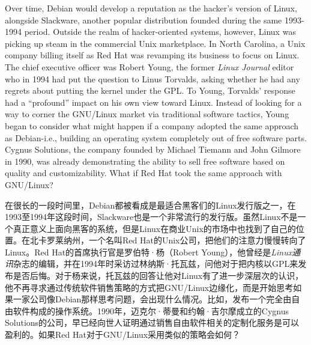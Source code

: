 \ifdefined\eng
Over time, Debian would develop a reputation as the hacker's version of Linux, alongside Slackware, another popular distribution founded during the same 1993-1994 period. Outside the realm of hacker-oriented systems, however, Linux was picking up steam in the commercial Unix marketplace. In North Carolina, a Unix company billing itself as Red Hat was revamping its business to focus on Linux. The chief executive officer was Robert Young, the former \textit{Linux Journal} editor who in 1994 had put the question to Linus Torvalds, asking whether he had any regrets about putting the kernel under the GPL. To Young, Torvalds' response had a ``profound'' impact on his own view toward Linux. Instead of looking for a way to corner the GNU/Linux market via traditional software tactics, Young began to consider what might happen if a company adopted the same approach as Debian-i.e., building an operating system completely out of free software parts. Cygnus Solutions, the company founded by Michael Tiemann and John Gilmore in 1990, was already demonstrating the ability to sell free software based on quality and customizability. What if Red Hat took the same approach with GNU/Linux?

\fi

\ifdefined\chs
在很长的一段时间里，Debian都被看成是最适合黑客们的Linux发行版之一，在1993至1994年这段时间，Slackware也是一个非常流行的发行版。虽然Linux不是一个真正意义上面向黑客的系统，但是Linux在商业Unix的市场中也找到了自己的位置。在北卡罗莱纳州，一个名叫Red Hat的Unix公司，把他们的注意力慢慢转向了Linux。Red Hat的首席执行官是罗伯特·杨（Robert Young），他曾经是\textit{Linux通讯}杂志的编辑，并在1994年时采访过林纳斯·托瓦兹，问他对于把内核以GPL来发布是否后悔。对于杨来说，托瓦兹的回答让他对Linux有了进一步深层次的认识，他不再寻求通过传统软件销售策略的方式把GNU/Linux边缘化，而是开始思考如果一家公司像Debian那样思考问题，会出现什么情况。比如，发布一个完全由自由软件构成的操作系统。1990年，迈克尔·蒂曼和约翰·吉尔摩成立的Cygnus Solutions的公司，早已经向世人证明通过销售自由软件相关的定制化服务是可以盈利的。如果Red Hat对于GNU/Linux采用类似的策略会如何？
\fi

